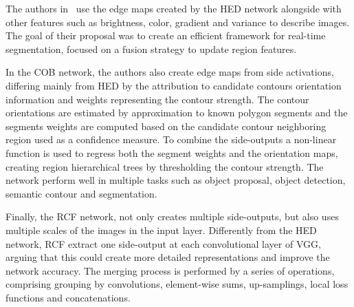 The authors in~\cite{cheng2016} use the edge maps created by the HED network alongside with other features such as brightness, color, gradient and variance to describe images. The goal of their proposal was to create an efficient framework for real-time segmentation, focused on a fusion strategy to update region features.


In the COB network, the authors also create edge maps from side activations, differing mainly from HED by the attribution to candidate contours orientation information and weights representing the contour strength. The contour orientations are estimated by approximation to known polygon segments and the segments weights are computed based on the candidate contour neighboring region used as a confidence measure. To combine the side-outputs a non-linear function is used to regress both the segment weights and the orientation maps, creating region hierarchical trees by thresholding the contour strength. The network perform well in multiple tasks such as object proposal, object detection, semantic contour and segmentation.


Finally, the RCF network, not only creates multiple side-outputs, but also uses multiple scales of the images in the input layer. Differently from the HED network, RCF extract one side-output at each convolutional layer of VGG, arguing that  this could create more detailed representations and improve the network accuracy. The merging process is performed by a series of operations, comprising grouping by convolutions, element-wise sums, up-samplings, local loss functions and concatenations.  







